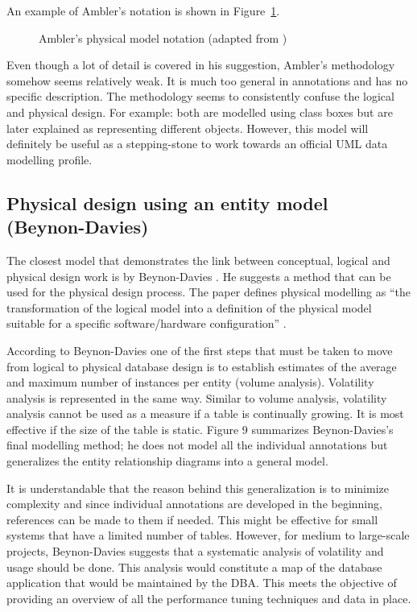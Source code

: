 \documentclass{llncs}
\begin{document}
An example of Ambler's notation is shown in Figure~\ref{fig-Ambler}.

\begin{figure}
	\caption{Ambler's physical model notation (adapted from \cite{Ambl-SW-2003-ADT})}
	\label{fig-Ambler}
\end{figure}

Even though a lot of detail is covered in his suggestion, Ambler's
methodology somehow seems relatively weak. It is much too general in
annotations and has no specific description. The methodology seems to
consistently confuse the logical and physical design. For example: both
are modelled using class boxes but are later explained as representing
different objects. However, this model will definitely be useful as a
stepping-stone to work towards an official UML data modelling profile.


\subsection{Physical design using an entity model (Beynon-Davies)}

The closest model that demonstrates the link between conceptual, logical
and physical design work is by Beynon-Davies \cite{BeDa-P-1992-PDD}. He
suggests a method that can be used for the physical design process. The
paper defines physical modelling as ``the transformation of the logical
model into a definition of the physical model suitable for a specific
software/hardware configuration'' \cite{BeDa-P-1992-PDD}.

According to Beynon-Davies one of the first steps that must be taken to
move from logical to physical database design is to establish estimates
of the average and maximum number of instances per entity (volume
analysis). Volatility analysis is represented in the same way. Similar
to volume analysis, volatility analysis cannot be used as a measure if a
table is continually growing. It is most effective if the size of the
table is static. Figure 9 summarizes Beynon-Davies's final modelling
method; he does not model all the individual annotations but generalizes
the entity relationship diagrams into a general model.

It is understandable that the reason behind this generalization is to
minimize complexity and since individual annotations are developed in
the beginning, references can be made to them if needed. This might be
effective for small systems that have a limited number of tables.
However, for medium to large-scale projects, Beynon-Davies suggests that
a systematic analysis of volatility and usage should be done. This
analysis would constitute a map of the database application that would
be maintained by the DBA. This meets the objective of providing an
overview of all the performance tuning techniques and data in place.
\end{document}
